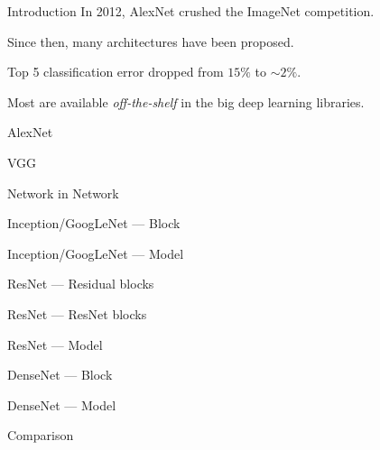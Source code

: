 \begin{frame}{Introduction}
  In 2012, AlexNet crushed the ImageNet competition.
  
  Since then, many architectures have been proposed.

  Top 5 classification error dropped from $15\%$ to $\sim2\%$.

  Most are available \emph{off-the-shelf} in the big deep learning libraries.
\end{frame}

\begin{frame}{AlexNet}
\end{frame}

\begin{frame}{VGG}
\end{frame}

\begin{frame}{Network in Network}
\end{frame}

\begin{frame}{Inception/GoogLeNet --- Block}
\end{frame}

\begin{frame}{Inception/GoogLeNet --- Model}
\end{frame}

\begin{frame}{ResNet --- Residual blocks}
\end{frame}

\begin{frame}{ResNet --- ResNet blocks}
\end{frame}

\begin{frame}{ResNet --- Model}
\end{frame}

\begin{frame}{DenseNet --- Block}
\end{frame}

\begin{frame}{DenseNet --- Model}
\end{frame}

\begin{frame}{Comparison}
\end{frame}
